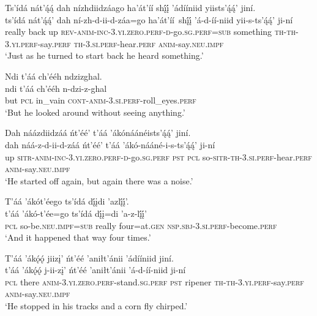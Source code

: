 \ea\label{ex:text5-6-5}
Ts’ídá nát’ą́ą́ dah nízhdiidzáago ha’át’íí shį́į́ ’ádííniid yiists’ą́ą́’ jiní.\\
\gll ts’ídá	nát’ą́ą́’	dah	ní-zh-d-ii-d-záa=go	ha’át’íí~{shį́į́}	’á-d-íí-niid	yii-s-ts’ą́ą́’	ji-ní\\
     really	back	up	\textsc{rev}-\textsc{anim}-\textsc{inc}-3.\textsc{yi}.\textsc{zero}.\textsc{perf}-\textsc{d}-go.\textsc{sg}.\textsc{perf}=\textsc{sub}	something	\textsc{th}-\textsc{th}-3.\textsc{yi}.\textsc{perf}-say.\textsc{perf}	\textsc{th}-3.\textsc{si}.\textsc{perf}-hear.\textsc{perf}	\textsc{anim}-say.\textsc{neu}.\textsc{impf}\\
\glt `Just as he turned to start back he heard something.'
\z

\ea\label{ex:text5-6-6}
Ndi t’áá ch’ééh ndzizghal.\\
\gll ndi	t’áá	ch’ééh	n-dzi-z-ghal\\
     but	\textsc{pcl}	in\_vain	\textsc{cont}-\textsc{anim}-3.\textsc{si}.\textsc{perf}-roll\_eyes.\textsc{perf}\\
\glt `But he looked around without seeing anything.'
\z

\ea\label{ex:text5-6-7}
Dah náázdiidzáá ńt’éé’ t’áá ’ákónáánéists’ą́ą́’ jiní.\\
\gll dah	náá-z-d-ii-d-záá	ńt’éé’	t’áá	’ákó-nááné-i-s-ts’ą́ą́’	ji-ní\\
     up	\textsc{sitr}-\textsc{anim}-\textsc{inc}-3.\textsc{yi}.\textsc{zero}.\textsc{perf}-\textsc{d}-go.\textsc{sg}.\textsc{perf}	\textsc{pst}	\textsc{pcl}	so-\textsc{sitr}-\textsc{th}-3.\textsc{si}.\textsc{perf}-hear.\textsc{perf}	\textsc{anim}-say.\textsc{neu}.\textsc{impf}\\
\glt `He started off again, but again there was a noise.'
\z

\ea\label{ex:text5-6-8}
T’áá ’ákót’éego ts’ídá dį́įdi ’azlį́į́’.\\
\gll t’áá	’ákó-t’ée=go	ts’ídá	dį́į=di	’a-z-lį́į́’\\
     \textsc{pcl}	so-be.\textsc{neu}.\textsc{impf}=\textsc{sub}	really	four=at.\textsc{gen}	\textsc{nsp}.\textsc{sbj}-3.\textsc{si}.\textsc{perf}-become.\textsc{perf}\\
\glt `And it happened that way four times.'
\z

\ea\label{ex:text5-6-9}
T’áá ’ákǫ́ǫ́ jiizį’ ńt’éé ’aniłt’ánii ’ádííniid jiní.\\
\gll t’áá	’ákǫ́ǫ́	j-ii-zį’	ńt’éé	’aniłt’ánii	’á-d-íí-niid	ji-ní\\
     \textsc{pcl}	there	\textsc{anim}-3.\textsc{yi}.\textsc{zero}.\textsc{perf}-stand.\textsc{sg}.\textsc{perf}	\textsc{pst}	ripener	\textsc{th}-\textsc{th}-3.\textsc{yi}.\textsc{perf}-say.\textsc{perf}	\textsc{anim}-say.\textsc{neu}.\textsc{impf}\\
\glt `He stopped in his tracks and a corn fly chirped.'
\z

